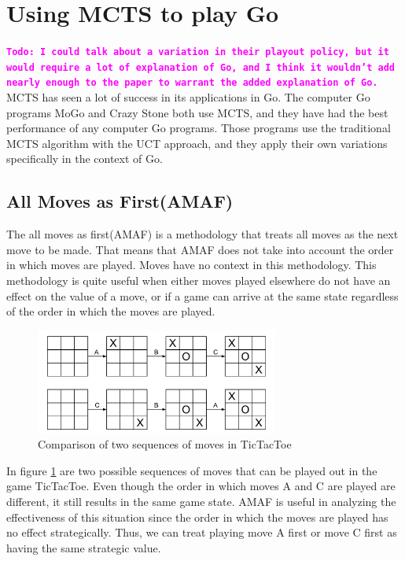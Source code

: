 \documentclass{sig-alternate}
\newcommand{\comment}[1]{{\bf \tt  {#1}}}
\newcommand{\todo}[1]{\textcolor{magenta}{\comment{Todo: {#1}}}}
\begin{document}
\section{Using MCTS to play Go}
\todo{I could talk about a variation in their playout policy, but it would require a lot of explanation of Go, and I think it wouldn't add nearly enough to the paper to warrant the added explanation of Go.}
MCTS has seen a lot of success in its applications in Go. The computer Go programs MoGo and Crazy Stone both use MCTS, and they have had the best performance of any computer Go programs\cite{RAVEinGo}. Those programs use the traditional MCTS algorithm with the UCT approach, and they apply their own variations specifically in the context of Go.

\subsection{All Moves as First(AMAF)}
The all moves as first(AMAF) is a methodology that treats all moves as the next move to be made. That means that AMAF does not take into account the order in which moves are played. Moves have no context in this methodology. This methodology is quite useful when either moves played elsewhere do not have an effect on the value of a move, or if a game can arrive at the same state regardless of the order in which the moves are played.

\begin{figure}[h]
	\includegraphics[width=8cm]{MoveOrderNotMattering.pdf}
	\centering
	\caption{Comparison of two sequences of moves in TicTacToe}
	\label{fig:TwoSeq}
\end{figure}

In figure \ref{fig:TwoSeq} are two possible sequences of moves that can be played out in the game TicTacToe. Even though the order in which moves A and C are played are different, it still results in the same game state. AMAF is useful in analyzing the effectiveness of this situation since the order in which the moves are played has no effect strategically. Thus, we can treat playing move A first or move C first as having the same strategic value.
\end{document}
